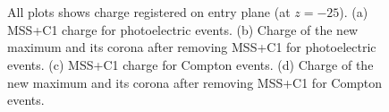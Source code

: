 \begin{figure}[h!]
        \begin{center}
                \\[-2ex]
                \\
                \caption{\label{fig.sipmmcc1} All plots shows charge registered on entry plane (at $z=-25$). (a) MSS+C1 charge for photoelectric events. (b) Charge of the new maximum and its corona after removing MSS+C1 for photoelectric events. (c) MSS+C1 charge for Compton events. (d) Charge of the new maximum and its corona after removing MSS+C1 for Compton events.}
        \end{center}
\end{figure}
